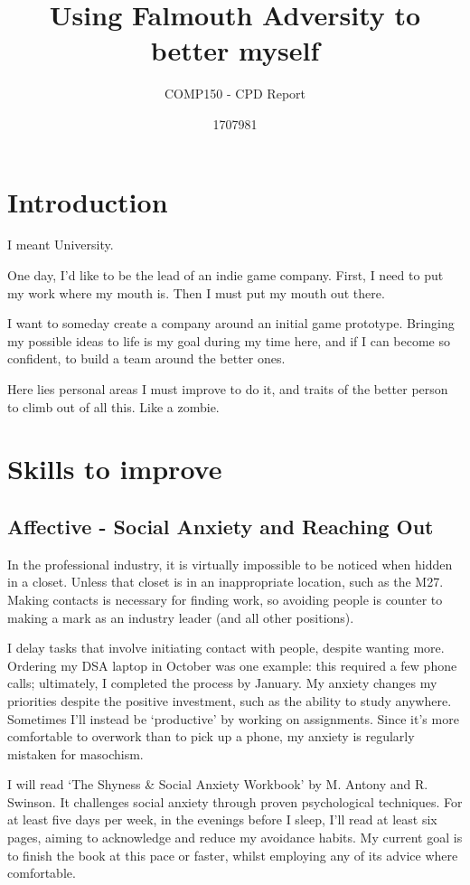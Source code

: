 \documentclass{scrartcl}
\title{Using Falmouth Adversity to better myself}
\subtitle{COMP150 - CPD Report}
\author{1707981}
\begin{document}
\maketitle

\section{Introduction} %
I meant University.

One day, I'd like to be the lead of an indie game company. First, I need to put my work where my mouth is. Then I must put my mouth out there.

I want to someday create a company around an initial game prototype. Bringing my possible ideas to life is my goal during my time here, and if I can become so confident, to build a team around the better ones.

Here lies personal areas I must improve to do it, and traits of the better person to climb out of all this. Like a zombie.

\section{Skills to improve}
\subsection{Affective - Social Anxiety and Reaching Out} %
In the professional industry, it is virtually impossible to be noticed when hidden in a closet. Unless that closet is in an inappropriate location, such as the M27. Making contacts is necessary for finding work, so avoiding people is counter to making a mark as an industry leader (and all other positions).

I delay tasks that involve initiating contact with people, despite wanting more. Ordering my DSA laptop in October was one example: this required a few phone calls; ultimately, I completed the process by January. My anxiety changes my priorities despite the positive investment, such as the ability to study anywhere. Sometimes I'll instead be `productive' by working on assignments. Since it's more comfortable to overwork than to pick up a phone, my anxiety is regularly mistaken for masochism.

I will read `The Shyness \& Social Anxiety Workbook' \cite{autismsucks} by M. Antony and R. Swinson. It challenges social anxiety through proven psychological techniques. For at least five days per week, in the evenings before I sleep, I'll read at least six pages, aiming to acknowledge and reduce my avoidance habits. My current goal is to finish the book at this pace or faster, whilst employing any of its advice where comfortable.
\end{document}
